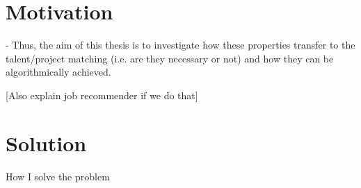 \section{Motivation}

- Thus, the aim of this thesis is to investigate how these properties transfer to the talent/project matching (i.e. are they necessary or not) and how they can be algorithmically achieved.

[Also explain job recommender if we do that]

\section{Solution}

How I solve the problem
